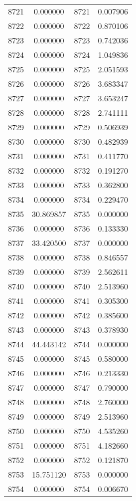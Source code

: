 \documentclass[12pt]{article}
\begin{document}
\begin{longtable}{@{}cccc@{}}
8721 & 0.000000 & 8721 & 0.007906 \\
8722 & 0.000000 & 8722 & 0.870106 \\
8723 & 0.000000 & 8723 & 0.742036 \\
8724 & 0.000000 & 8724 & 1.049836 \\
8725 & 0.000000 & 8725 & 2.051593 \\
8726 & 0.000000 & 8726 & 3.683347 \\
8727 & 0.000000 & 8727 & 3.653247 \\
8728 & 0.000000 & 8728 & 2.741111 \\
8729 & 0.000000 & 8729 & 0.506939 \\
8730 & 0.000000 & 8730 & 0.482939 \\
8731 & 0.000000 & 8731 & 0.411770 \\
8732 & 0.000000 & 8732 & 0.191270 \\
8733 & 0.000000 & 8733 & 0.362800 \\
8734 & 0.000000 & 8734 & 0.229470 \\
8735 & 30.869857 & 8735 & 0.000000 \\
8736 & 0.000000 & 8736 & 0.133330 \\
8737 & 33.420500 & 8737 & 0.000000 \\
8738 & 0.000000 & 8738 & 0.846557 \\
8739 & 0.000000 & 8739 & 2.562611 \\
8740 & 0.000000 & 8740 & 2.513960 \\
8741 & 0.000000 & 8741 & 0.305300 \\
8742 & 0.000000 & 8742 & 0.385600 \\
8743 & 0.000000 & 8743 & 0.378930 \\
8744 & 44.443142 & 8744 & 0.000000 \\
8745 & 0.000000 & 8745 & 0.580000 \\
8746 & 0.000000 & 8746 & 0.213330 \\
8747 & 0.000000 & 8747 & 0.790000 \\
8748 & 0.000000 & 8748 & 2.760000 \\
8749 & 0.000000 & 8749 & 2.513960 \\
8750 & 0.000000 & 8750 & 4.535260 \\
8751 & 0.000000 & 8751 & 4.182660 \\
8752 & 0.000000 & 8752 & 0.121870 \\
8753 & 15.751120 & 8753 & 0.000000 \\
8754 & 0.000000 & 8754 & 0.006670 \\

\end{longtable}
\end{document}
